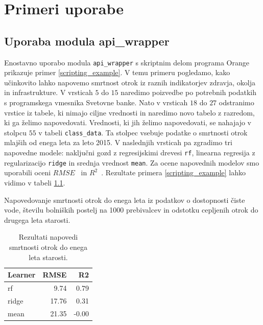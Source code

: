 \chapter{Primeri uporabe}


\section{Uporaba modula api\_wrapper}

Enostavno uporabo modula \verb|api_wrapper| s skriptnim delom programa Orange
prikazuje primer \ref{scripting_example}. V temu primeru pogledamo, kako
učinkovito lahko napovemo smrtnost otrok iz raznih indikatorjev zdravja,
okolja in infrastrukture. V vrsticah $5$ do $15$ naredimo poizvedbe po
potrebnih podatkih s programskega vmesnika Svetovne banke. Nato v vrsticah $18$
do $27$ odstranimo vrstice iz tabele, ki nimajo ciljne vrednosti in naredimo novo tabelo z
razredom, ki ga želimo napovedovati. Vrednosti, ki jih želimo napovedovati, se
nahajajo v stolpcu $55$ v tabeli \verb|class_data|. Ta stolpec vsebuje podatke
o smrtnosti otrok mlajših od enega leta za leto 2015. V naslednjih vrsticah
pa zgradimo tri napovedne modele: naključni gozd z
regresijskimi drevesi \verb|rf|, linearna regresija z regularizacijo 
\verb|ridge| in srednja vrednost \verb|mean|.
Za ocene napovednih modelov smo uporabili oceni
$RMSE$~ in 
$R^2$~.
Rezultate primera \ref{scripting_example} lahko vidimo v tabeli 
\ref{rezultati_skripte}.


\begin{snippet}
\begin{center}

\end{center}
\cprotect
\caption{Napovedovanje smrtnosti otrok do enega leta iz podatkov o dostopnosti
  čiste vode, številu bolniških postelj na 1000 prebivalcev in odstotku
  cepljenih otrok do drugega leta starosti.}
\label{scripting_example}
\end{snippet} 

\begin{table}
\begin{center}

\begin{tabular}{l|r|r}
  Learner & RMSE & R2 \\ \hline
  rf & 9.74 & 0.79 \\
  ridge & 17.76 & 0.31 \\
  mean & 21.35 & -0.00
\end{tabular}
\end{center}
\cprotect
\caption{Rezultati napovedi smrtnosti otrok do enega leta starosti.}
\label{rezultati_skripte}
\end{table} 



